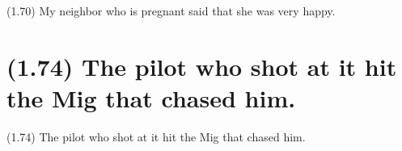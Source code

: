 \documentclass{article}
\begin{document}
\bigbreak
\begin{enumerate*}
\item[(1.70)] My neighbor who is pregnant said that she was very happy.
\end{enumerate*}
\bigbreak

\bigbreak
\begin{minipage}{\textwidth}
\end{minipage}
\bigbreak

\bigbreak
\begin{minipage}{\textwidth}
\end{minipage}
\bigbreak

\clearpage

%
%

\section*{(1.74) The pilot who shot at it hit the Mig that chased him.}

\bigbreak
\begin{enumerate*}
\item[(1.74)] The pilot who shot at it hit the Mig that chased him.
\end{enumerate*}
\bigbreak
\end{document}
